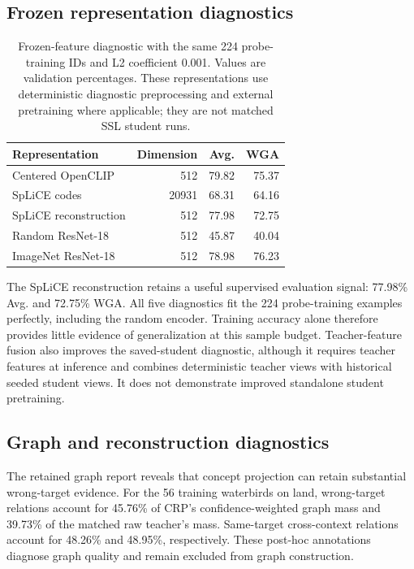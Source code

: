 \documentclass[11pt,a4paper]{article}
\begin{document}
\subsection{Frozen representation diagnostics}
\begin{table}[t]
\centering
\caption{Frozen-feature diagnostic with the same 224 probe-training IDs and
L2 coefficient 0.001. Values are validation percentages. These representations
use deterministic diagnostic preprocessing and external pretraining where
applicable; they are not matched SSL student runs.}
\begin{tabular}{lrrr}
\toprule
Representation & Dimension & Avg. & WGA \\
\midrule
Centered OpenCLIP & 512 & 79.82 & 75.37 \\
SpLiCE codes & 20931 & 68.31 & 64.16 \\
SpLiCE reconstruction & 512 & 77.98 & 72.75 \\
Random ResNet-18 & 512 & 45.87 & 40.04 \\
ImageNet ResNet-18 & 512 & 78.98 & 76.23 \\
\bottomrule
\end{tabular}
\label{tab:signal}
\end{table}

The SpLiCE reconstruction retains a useful supervised evaluation signal:
77.98\% Avg. and 72.75\% WGA. All five diagnostics fit the 224 probe-training
examples perfectly, including the random encoder. Training accuracy alone
therefore provides little evidence of generalization at this sample budget.
Teacher-feature fusion also improves the saved-student diagnostic, although it
requires teacher features at inference and combines deterministic teacher views
with historical seeded student views. It does not demonstrate improved standalone
student pretraining.

\subsection{Graph and reconstruction diagnostics}
The retained graph report reveals that concept projection can retain substantial
wrong-target evidence. For the 56 training waterbirds on land, wrong-target
relations account for 45.76\% of CRP's confidence-weighted graph mass and 39.73\%
of the matched raw teacher's mass. Same-target cross-context relations account
for 48.26\% and 48.95\%, respectively. These post-hoc annotations diagnose graph
quality and remain excluded from graph construction.
\end{document}
